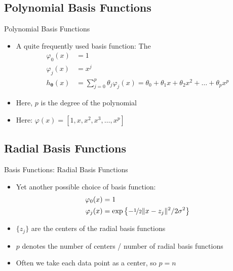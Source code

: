 \subsection{Polynomial Basis Functions}

\begin{frame}{Polynomial Basis Functions}{}
	\begin{itemize}
		\item A quite frequently used basis function: The 
		\begin{align*}
			\varphi_0(x) 			&= 1 	\\
			\varphi_j(x) 			&= x^j	\\
			h_{\bm{\theta}}(x) 	&= \sum_{j=0}^p \theta_j \varphi_j(x) = \theta_0 + \theta_1 x +
									\theta_2 x^2 + \dots + \theta_p x^p
		\end{align*}
		\item Here, $p$ is the degree of the polynomial
		\item Here: $\varphi(x) = [1, x, x^2, x^3, \dots, x^p]$
	\end{itemize}
\end{frame}


\subsection{Radial Basis Functions}

\begin{frame}{Basis Functions: Radial Basis Functions}{}
	\begin{itemize}
		\item Yet another possible choice of basis function: 
		\begin{align}
			\varphi_0(x) 	&= 1 \\
			\varphi_j(x) 	&= \exp\left\{ - \nicefrac{1}{2} \Vert x - z_j \Vert^2 / 2 \sigma^2 \right\}
		\end{align}
		\item $\{z_j\}$ are the centers of the radial basis functions
		\item $p$ denotes the number of centers / number of radial basis functions
		\item Often we take each data point as a center, so $p = n$
	\end{itemize}
\end{frame}


